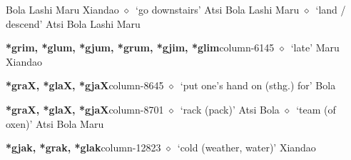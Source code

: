 \hspace{1ex}
         Bola 
\hspace{1ex}
         Lashi 
\hspace{1ex}
         Maru 
\hspace{1ex}
         Xiandao 
\hspace{1ex}
         $\diamond$~`go downstairs'
         Atsi 
\hspace{1ex}
         Bola 
\hspace{1ex}
         Lashi 
\hspace{1ex}
         Maru 
\hspace{1ex}
         $\diamond$~`land / descend'
         Atsi 
\hspace{1ex}
         Bola 
\hspace{1ex}
         Lashi 
\hspace{1ex}
         Maru 
  \item {\footnotesize \textbf{*grim, *glum, *gjum, *grum, *gjim, *glim}}{\tiny column-6145}
         $\diamond$~`late'
         Maru 
\hspace{1ex}
         Xiandao 
  \item {\footnotesize \textbf{*graX, *glaX, *gjaX}}{\tiny column-8645}
         $\diamond$~`put one's hand on (sthg.) for'
         Bola 
  \item {\footnotesize \textbf{*graX, *glaX, *gjaX}}{\tiny column-8701}
         $\diamond$~`rack (pack)'
         Atsi 
\hspace{1ex}
         Bola 
\hspace{1ex}
         $\diamond$~`team (of oxen)'
         Atsi 
\hspace{1ex}
         Bola 
\hspace{1ex}
         Maru 
  \item {\footnotesize \textbf{*gjak, *grak, *glak}}{\tiny column-12823}
         $\diamond$~`cold (weather, water)'
         Xiandao 

